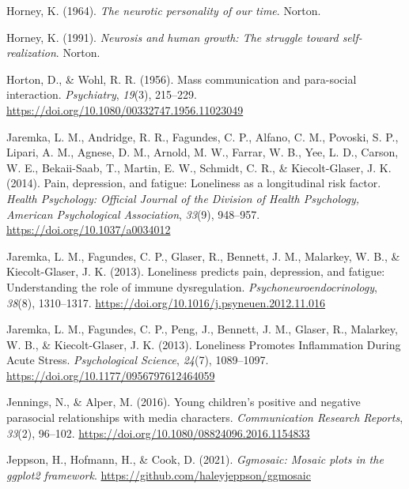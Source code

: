 \documentclass[
]{udthesis}
\newlength{\cslhangindent}
\newenvironment{CSLReferences}[2] %
 {\begin{list}{}{%
  \setlength{\itemindent}{0pt}
  \setlength{\leftmargin}{0pt}
  \setlength{\parsep}{0pt}
  \ifodd #1
   \setlength{\leftmargin}{\cslhangindent}
   \setlength{\itemindent}{-1\cslhangindent}
  \fi
  \setlength{\itemsep}{#2\baselineskip}}}
 {\end{list}}
\begin{document}
\begin{CSLReferences}{1}{0}
Horney, K. (1964). \emph{The neurotic personality of our time}. {Norton}.

Horney, K. (1991). \emph{Neurosis and human growth: The struggle toward self-realization}. {Norton}.

Horton, D., \& Wohl, R. R. (1956). Mass communication and para-social interaction. \emph{Psychiatry}, \emph{19}(3), 215--229. \url{https://doi.org/10.1080/00332747.1956.11023049}

Jaremka, L. M., Andridge, R. R., Fagundes, C. P., Alfano, C. M., Povoski, S. P., Lipari, A. M., Agnese, D. M., Arnold, M. W., Farrar, W. B., Yee, L. D., Carson, W. E., Bekaii-Saab, T., Martin, E. W., Schmidt, C. R., \& Kiecolt-Glaser, J. K. (2014). Pain, depression, and fatigue: Loneliness as a longitudinal risk factor. \emph{Health Psychology: Official Journal of the Division of Health Psychology, American Psychological Association}, \emph{33}(9), 948--957. \url{https://doi.org/10.1037/a0034012}

Jaremka, L. M., Fagundes, C. P., Glaser, R., Bennett, J. M., Malarkey, W. B., \& Kiecolt-Glaser, J. K. (2013). Loneliness predicts pain, depression, and fatigue: Understanding the role of immune dysregulation. \emph{Psychoneuroendocrinology}, \emph{38}(8), 1310--1317. \url{https://doi.org/10.1016/j.psyneuen.2012.11.016}

Jaremka, L. M., Fagundes, C. P., Peng, J., Bennett, J. M., Glaser, R., Malarkey, W. B., \& Kiecolt-Glaser, J. K. (2013). Loneliness {Promotes Inflammation During Acute Stress}. \emph{Psychological Science}, \emph{24}(7), 1089--1097. \url{https://doi.org/10.1177/0956797612464059}

Jennings, N., \& Alper, M. (2016). Young children{'}s positive and negative parasocial relationships with media characters. \emph{Communication Research Reports}, \emph{33}(2), 96--102. \url{https://doi.org/10.1080/08824096.2016.1154833}

Jeppson, H., Hofmann, H., \& Cook, D. (2021). \emph{Ggmosaic: Mosaic plots in the ggplot2 framework}. \url{https://github.com/haleyjeppson/ggmosaic}


\end{CSLReferences}
\end{document}
